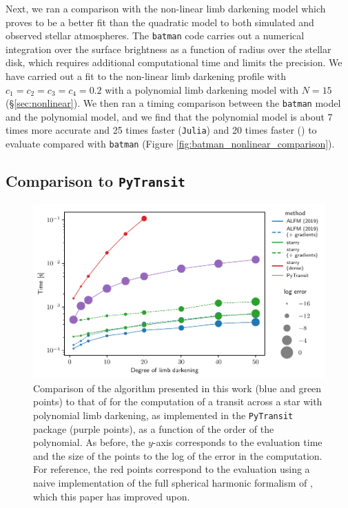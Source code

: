 \documentclass[modern,trackchanges]{aastex63}
\begin{document}
Next, we ran a comparison with the non-linear limb darkening model which
proves to be a better fit than the quadratic model to both simulated
and observed stellar atmospheres.  The \texttt{batman} code carries out
a numerical integration over the surface brightness as a function of
radius over the stellar disk, which requires additional computational
time and limits the precision.  We have carried out a fit to the
non-linear limb darkening profile with $c_1=c_2=c_3=c_4=0.2$ with a
polynomial limb darkening model with $N=15$ (\S \ref{sec:nonlinear}).  
We then ran a timing comparison between the \texttt{batman} model and the 
polynomial model, and we find that the polynomial model is about 7 times
more accurate and 25 times faster (\texttt{Julia})
and 20 times faster (\starry) to evaluate compared with \texttt{batman} (Figure
\ref{fig:batman_nonlinear_comparison}).

\subsection{Comparison to \texttt{PyTransit}} \label{sec:comparison_pytransit}

\begin{figure}[t!]
    \begin{centering}
    \includegraphics[width=\linewidth]{figures/python/compare_to_gimenez.pdf}
    \caption{Comparison of the algorithm presented in this work (blue and
             green points) to that of
             \citet{Gimenez2006} for the computation of a transit across a
             star with polynomial limb darkening, as implemented in the
             \texttt{PyTransit} package \citep{Parviainen2015b}
             (purple points), as a function
             of the order of the polynomial. As before, the $y$-axis
             corresponds to the evaluation time and the size of the points
             to the log of the error in the computation. For reference, the
             red points correspond to the evaluation using a naive implementation
             of the full spherical harmonic formalism of \citet{starry}, which
             this paper has improved upon.
    \label{fig:gimenez_comparison}}
    \end{centering}
\end{figure}
\end{document}
